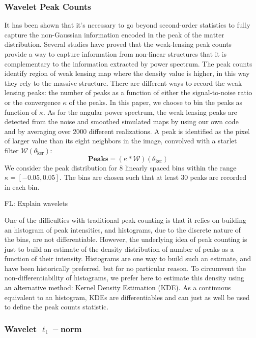\documentclass[twocolumn,twocolappendix]{aastex63}
\newcommand{\EiffL}[1]{{\color{cyan}FL: #1}}
\begin{document}
\subsubsection{Wavelet Peak Counts}
It has been shown that it's necessary to go beyond second-order statistics to fully capture the non-Gaussian information encoded in the peak of the matter distribution. Several studies have proved that the  weak-lensing peak counts provide a way to capture information from non-linear structures that it is complementary to the information extracted by power spectrum.
The peak counts identify region of weak lensing map where the density value is higher, in this way they rely to the massive structure.
There are different ways to record the weak lensing peaks: the number of peaks as a function of either the signal-to-noise ratio or the convergence $\kappa$ of the peaks. 
In this paper, we choose to bin the peaks as function of $\kappa$. 
As for the angular power spectrum, the weak lensing peaks are detected from the noise and smoothed simulated maps by using our own code and by averaging over 2000 different realizations. A peak is identified as the pixel of larger value than its eight neighbors in the image, convolved with a starlet filter $\mathcal{W}(\theta_{\text{ker}})$:
\begin{equation}
    \textbf{Peaks}=(\kappa*\mathcal{W})(\theta_{\text{ker}})
\end{equation}
 We consider the peak distribution for 8 linearly spaced bins within the range $\kappa=[-0.05, 0.05]$. The bins are chosen such that at least 30 peaks are recorded in each bin. 

\EiffL{Explain wavelets}

One of the difficulties with traditional peak counting is that it relies on building
an histogram of peak intensities, and histograms, due to the discrete nature of the bins, are not differentiable. However, the underlying idea of peak counting is just to build an estimate of the density distribution of number of peaks as a function of their intensity. Histograms are one way to build such an estimate, and have been historically preferred, but for no particular reason. To circumvent the non-differentiability of histograms, we prefer here to estimate this density using an alternative method: Kernel Density Estimation (KDE). As a continuous equivalent to an histogram, KDEs are differentiables and can just as well be used to define the peak counts statistic.

\subsubsection{Wavelet $\ell_1-$norm}
\end{document}
